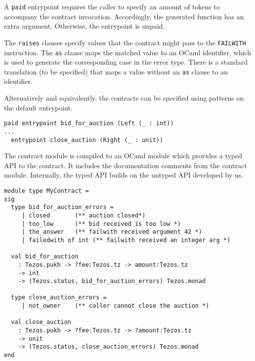 \documentclass[a4paper]{llncs}
\begin{document}
A \lstinline/paid/ entrypoint requires the caller to specify an amount of tokens to
accompany the contract invocation. Accordingly, the generated function has an extra
argument. Otherwise, the entrypoint is unpaid. 

The \lstinline/raises/ clauses specify values that the contract might
pass to the \texttt{FAILWITH} instruction. The \lstinline/as/ clause
maps the matched value to an OCaml identifier, which is used to
generate the corresponding case in the error type. There is a standard
translation (to be specified) that maps a value without an
\lstinline/as/ clause to an identifier.

Alternatively and equivalently, the contracts can be specified using
patterns on the default entrypoint.

\begin{lstlisting}[caption={Alternative syntax for entrypoints},label={lst:alternative-syntax}]
  paid entrypoint bid_for_auction (Left (_ : int))
...
  entrypoint close_auction (Right (_ : unit))
\end{lstlisting}

The contract module is compiled to an OCaml module which provides a typed API to the
contract. It includes the documentation comments from the contract
module. Internally, the typed API builds on the untyped API developed
by us. 

\begin{lstlisting}[caption={Generated signature},label={lst:generated-signature}]
module type MyContract =
sig
  type bid_for_auction_errors = 
     | closed       (** auction closed*)
     | too_low      (** bid received is too low *)
     | the_answer   (** failwith received argument 42 *)
     | failedwith of int (** failwith received an integer arg *)

  val bid_for_auction
    : Tezos.pukh -> ?fee:Tezos.tz -> amount:Tezos.tz
    -> int
    -> (Tezos.status, bid_for_auction_errors) Tezos.monad

  type close_auction_errors = 
     | not_owner    (** caller cannot close the auction *)

  val close_auction
    : Tezos.pukh -> ?fee:Tezos.tz -> ?amount:Tezos.tz
    -> unit
    -> (Tezos.status, close_auction_errors) Tezos.monad
end
\end{lstlisting}
\end{document}
